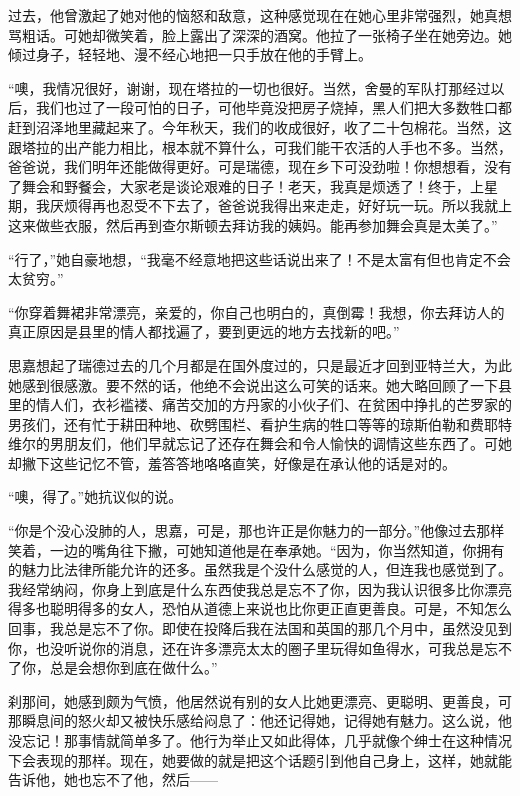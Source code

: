 \par 过去，他曾激起了她对他的恼怒和敌意，这种感觉现在在她心里非常强烈，她真想骂粗话。可她却微笑着，脸上露出了深深的酒窝。他拉了一张椅子坐在她旁边。她倾过身子，轻轻地、漫不经心地把一只手放在他的手臂上。
\par “噢，我情况很好，谢谢，现在塔拉的一切也很好。当然，舍曼的军队打那经过以后，我们也过了一段可怕的日子，可他毕竟没把房子烧掉，黑人们把大多数牲口都赶到沼泽地里藏起来了。今年秋天，我们的收成很好，收了二十包棉花。当然，这跟塔拉的出产能力相比，根本就不算什么，可我们能干农活的人手也不多。当然，爸爸说，我们明年还能做得更好。可是瑞德，现在乡下可没劲啦！你想想看，没有了舞会和野餐会，大家老是谈论艰难的日子！老天，我真是烦透了！终于，上星期，我厌烦得再也忍受不下去了，爸爸说我得出来走走，好好玩一玩。所以我就上这来做些衣服，然后再到查尔斯顿去拜访我的姨妈。能再参加舞会真是太美了。”
\par “行了，”她自豪地想，“我毫不经意地把这些话说出来了！不是太富有但也肯定不会太贫穷。”
\par “你穿着舞裙非常漂亮，亲爱的，你自己也明白的，真倒霉！我想，你去拜访人的真正原因是县里的情人都找遍了，要到更远的地方去找新的吧。”
\par 思嘉想起了瑞德过去的几个月都是在国外度过的，只是最近才回到亚特兰大，为此她感到很感激。要不然的话，他绝不会说出这么可笑的话来。她大略回顾了一下县里的情人们，衣衫褴褛、痛苦交加的方丹家的小伙子们、在贫困中挣扎的芒罗家的男孩们，还有忙于耕田种地、砍劈围栏、看护生病的牲口等等的琼斯伯勒和费耶特维尔的男朋友们，他们早就忘记了还存在舞会和令人愉快的调情这些东西了。可她却撇下这些记忆不管，羞答答地咯咯直笑，好像是在承认他的话是对的。
\par “噢，得了。”她抗议似的说。
\par “你是个没心没肺的人，思嘉，可是，那也许正是你魅力的一部分。”他像过去那样笑着，一边的嘴角往下撇，可她知道他是在奉承她。“因为，你当然知道，你拥有的魅力比法律所能允许的还多。虽然我是个没什么感觉的人，但连我也感觉到了。我经常纳闷，你身上到底是什么东西使我总是忘不了你，因为我认识很多比你漂亮得多也聪明得多的女人，恐怕从道德上来说也比你更正直更善良。可是，不知怎么回事，我总是忘不了你。即使在投降后我在法国和英国的那几个月中，虽然没见到你，也没听说你的消息，还在许多漂亮太太的圈子里玩得如鱼得水，可我总是忘不了你，总是会想你到底在做什么。”
\par 刹那间，她感到颇为气愤，他居然说有别的女人比她更漂亮、更聪明、更善良，可那瞬息间的怒火却又被快乐感给闷息了：他还记得她，记得她有魅力。这么说，他没忘记！那事情就简单多了。他行为举止又如此得体，几乎就像个绅士在这种情况下会表现的那样。现在，她要做的就是把这个话题引到他自己身上，这样，她就能告诉他，她也忘不了他，然后——
